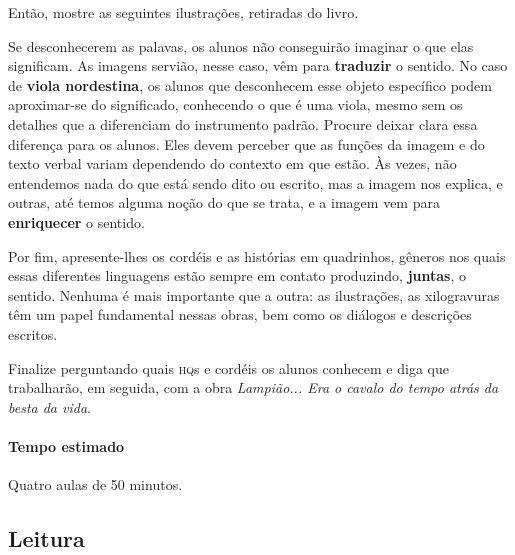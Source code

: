\documentclass[11pt]{extarticle}
\begin{document}
Então, mostre as seguintes ilustrações, retiradas do livro.



Se desconhecerem as palavas, os alunos não conseguirão imaginar o que elas significam. As imagens servião, nesse caso, vêm para 
\textbf{traduzir} o sentido. No caso de \textbf{viola nordestina}, os alunos 
que desconhecem esse objeto específico podem aproximar-se do significado, conhecendo o que é uma viola, mesmo sem os detalhes que a diferenciam do instrumento padrão. 
Procure deixar clara essa diferença para os alunos. Eles devem perceber que as funções
da imagem e do texto verbal variam dependendo do contexto em que estão. Às vezes, 
não entendemos nada do que está sendo dito ou escrito, mas a imagem nos explica,
e outras, até temos alguma noção do que se trata, e a imagem vem para \textbf{enriquecer}
o sentido. 


Por fim, apresente-lhes os cordéis e as histórias em quadrinhos, gêneros nos quais 
essas diferentes linguagens estão sempre em contato produzindo, \textbf{juntas},
o sentido. Nenhuma é mais importante que a outra: as ilustrações, as xilogravuras
têm um papel fundamental nessas obras, bem como os diálogos e descrições escritos.

Finalize perguntando quais \textsc{hq}s e cordéis os alunos conhecem e diga que trabalharão, em seguida,
com a obra \textit{Lampião... Era o cavalo do tempo atrás da besta da vida}.

\paragraph{Tempo estimado} Quatro aulas de 50 minutos.

\subsection{Leitura}

\end{document}

